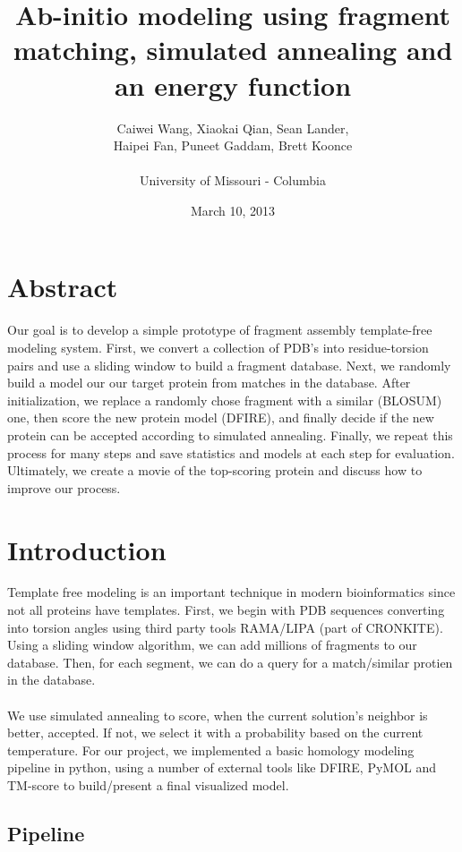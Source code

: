 \documentclass{article}
\title{Ab-initio modeling using fragment matching, simulated annealing and an energy function}
\author{Caiwei Wang, Xiaokai Qian, Sean Lander, \\Haipei Fan, Puneet Gaddam, Brett Koonce\\\\University of Missouri - Columbia}
\date{March 10, 2013}
\begin{document}
\maketitle

\section{Abstract}
Our goal is to develop a simple prototype of fragment assembly template-free modeling system. First, we convert a collection of PDB's into residue-torsion pairs and use a sliding window to build a fragment database. Next, we randomly build a model our our target protein from matches in the database. After initialization, we replace a randomly chose fragment with a similar (BLOSUM) one, then score the new protein model (DFIRE), and finally decide if the new protein can be accepted according to simulated annealing. Finally, we repeat this process for many steps and save statistics and models at each step for evaluation. Ultimately, we create a movie of the top-scoring protein and discuss how to improve our process.

\section{Introduction}

Template free modeling is an important technique in modern bioinformatics since not all proteins have templates. First, we begin with PDB sequences converting into torsion angles using third party tools RAMA/LIPA (part of CRONKITE). Using a sliding window algorithm, we can add millions of fragments to our database. Then, for each segment, we can do a query for a match/similar protien in the database.\\\\
We use simulated annealing to score, when the current solution’s neighbor is better, accepted. If not, we select it with a probability based on the current temperature. For our project, we implemented a basic homology modeling pipeline in python, using a number of external tools like DFIRE, PyMOL and TM-score to build/present a final visualized model.


\subsection{Pipeline}
\end{document}
